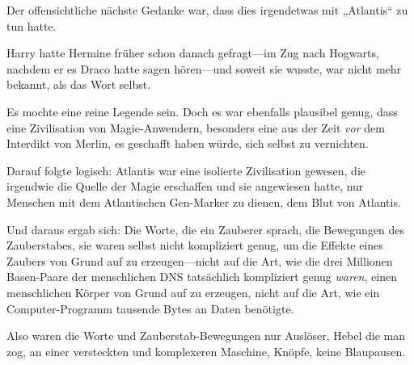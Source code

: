 Der offensichtliche nächste Gedanke war, dass dies irgendetwas mit „Atlantis“ zu tun hatte.

Harry hatte Hermine früher schon danach gefragt—im Zug nach Hogwarts, nachdem er es Draco hatte sagen hören—und soweit sie wusste, war nicht mehr bekannt, als das Wort selbst.

Es mochte eine reine Legende sein. Doch es war ebenfalls plausibel genug, dass eine Zivilisation von Magie-Anwendern, besonders eine aus der Zeit \emph{vor} dem Interdikt von Merlin, es geschafft haben würde, sich selbst zu vernichten.

Darauf folgte logisch: Atlantis war eine isolierte Zivilisation gewesen, die irgendwie die Quelle der Magie erschaffen und sie angewiesen hatte, nur Menschen mit dem Atlantischen Gen-Marker zu dienen, dem Blut von Atlantis.

Und daraus ergab sich: Die Worte, die ein Zauberer sprach, die Bewegungen des Zauberstabes, sie waren selbst nicht kompliziert genug, um die Effekte eines Zaubers von Grund auf zu erzeugen—nicht auf die Art, wie die drei Millionen Basen-Paare der menschlichen DNS tatsächlich kompliziert genug \emph{waren}, einen menschlichen Körper von Grund auf zu erzeugen, nicht auf die Art, wie ein Computer-Programm tausende Bytes an Daten benötigte.

Also waren die Worte und Zauberstab-Bewegungen nur Auslöser, Hebel die man zog, an einer versteckten und komplexeren Maschine, Knöpfe, keine Blaupausen.

